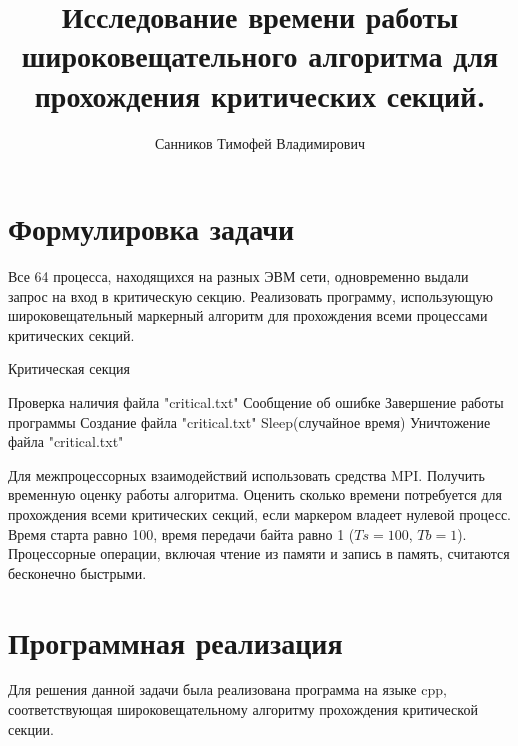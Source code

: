 \documentclass[openany, twoside, a4paper, 12pt]{extbook}
\author{Санников Тимофей Владимирович}
\title{Исследование времени работы широковещательного алгоритма для прохождения критических секций.}
\begin{document}
	\maketitle

	\section*{Формулировка задачи}
	Все 64 процесса, находящихся на разных ЭВМ сети,
	одновременно выдали запрос на вход в критическую секцию.
	Реализовать программу,
	использующую широковещательный маркерный алгоритм для прохождения всеми процессами критических секций.
	
	\begin{algorithm}
		\caption{Критическая секция}
		\begin{algorithmic}[1]
		    \STATE Проверка наличия файла "critical.txt"
		        \STATE Сообщение об ошибке
		        \STATE Завершение работы программы
		    \ELSE
		        \STATE Создание файла "critical.txt"
		        \STATE Sleep(случайное время)
		        \STATE Уничтожение файла "critical.txt"
		    \ENDIF
		\end{algorithmic}
	\end{algorithm}

	Для межпроцессорных взаимодействий использовать средства MPI.\@
	Получить временную оценку работы алгоритма.
	Оценить сколько времени потребуется для прохождения всеми критических секций,
	если маркером владеет нулевой процесс.
	Время старта равно 100, время передачи байта равно 1 ($ Ts=100 $, $ Tb=1 $).
	Процессорные операции, включая чтение из памяти и запись в память,
	считаются бесконечно быстрыми.

	\section*{Программная реализация}
	Для решения данной задачи была реализована программа на языке cpp, соответствующая
	широковещательному алгоритму прохождения критической секции.
\end{document}
